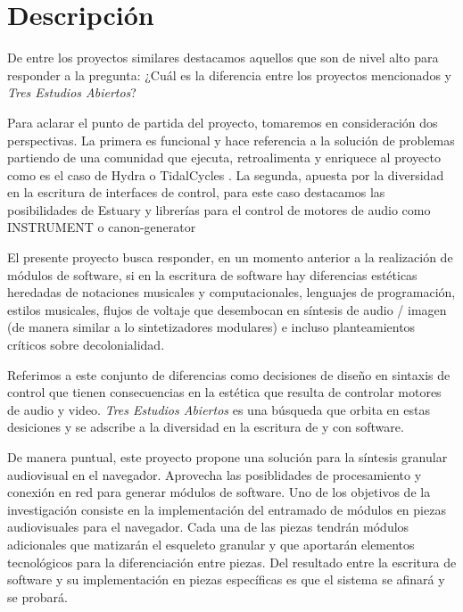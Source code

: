 \section*{Descripción} %

De entre los proyectos similares destacamos aquellos que son de nivel alto para responder a la pregunta: ¿Cuál es la diferencia entre los proyectos mencionados y \textit{Tres Estudios Abiertos}?

Para aclarar el punto de partida del proyecto, tomaremos en consideración dos perspectivas. La primera es funcional y hace referencia a la solución de problemas partiendo de una comunidad que ejecuta, retroalimenta y enriquece al proyecto como es el caso de Hydra \citep{hydra} o TidalCycles \citep{tidal}. La segunda, apuesta por la diversidad en la escritura de interfaces de control, para este caso destacamos las posibilidades de Estuary \citep{estuary} y librerías para el control de motores de audio como INSTRUMENT \citep{instrument} o canon-generator \citep{canongenerator}

El presente proyecto busca responder, en un momento anterior a la realización de módulos de software, si en la escritura de software hay diferencias estéticas heredadas de notaciones musicales y computacionales, lenguajes de programación, estilos musicales, flujos de voltaje que desembocan en síntesis de audio / imagen (de manera similar a lo sintetizadores modulares) e incluso planteamientos críticos sobre decolonialidad.

Referimos a este conjunto de diferencias como decisiones de diseño en sintaxis de control que tienen consecuencias en la estética que resulta de controlar motores de audio y video. \textit{Tres Estudios Abiertos} es una búsqueda que orbita en estas desiciones y se adscribe a la diversidad en la escritura de y con software. 

De manera puntual, este proyecto propone una solución para la síntesis granular audiovisual en el navegador. Aprovecha las posiblidades de procesamiento y conexión en red para generar módulos de software. Uno de los objetivos de la investigación consiste en la implementación del entramado de módulos en piezas audiovisuales para el navegador. Cada una de las piezas tendrán módulos adicionales que matizarán el esqueleto granular y que aportarán elementos tecnológicos para la diferenciación entre piezas. Del resultado entre la escritura de software y su implementación en piezas específicas es que el sistema se afinará y se probará. 

